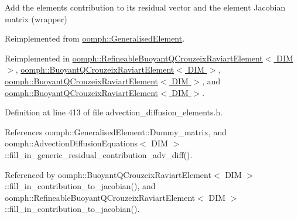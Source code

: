 Add the element\textquotesingle{}s contribution to its residual vector and the element Jacobian matrix (wrapper) 



Reimplemented from \hyperlink{classoomph_1_1GeneralisedElement_a6ae09fc0d68e4309ac1b03583d252845}{oomph\+::\+Generalised\+Element}.



Reimplemented in \hyperlink{classoomph_1_1RefineableBuoyantQCrouzeixRaviartElement_a0d05a727999c7f102f3fe2bacce38f6b}{oomph\+::\+Refineable\+Buoyant\+Q\+Crouzeix\+Raviart\+Element$<$ D\+I\+M $>$}, \hyperlink{classoomph_1_1BuoyantQCrouzeixRaviartElement_a7bd9313dd697c1219cee4a65692388b5}{oomph\+::\+Buoyant\+Q\+Crouzeix\+Raviart\+Element$<$ D\+I\+M $>$}, \hyperlink{classoomph_1_1BuoyantQCrouzeixRaviartElement_a7bd9313dd697c1219cee4a65692388b5}{oomph\+::\+Buoyant\+Q\+Crouzeix\+Raviart\+Element$<$ D\+I\+M $>$}, and \hyperlink{classoomph_1_1BuoyantQCrouzeixRaviartElement_a7bd9313dd697c1219cee4a65692388b5}{oomph\+::\+Buoyant\+Q\+Crouzeix\+Raviart\+Element$<$ D\+I\+M $>$}.



Definition at line 413 of file advection\+\_\+diffusion\+\_\+elements.\+h.



References oomph\+::\+Generalised\+Element\+::\+Dummy\+\_\+matrix, and oomph\+::\+Advection\+Diffusion\+Equations$<$ D\+I\+M $>$\+::fill\+\_\+in\+\_\+generic\+\_\+residual\+\_\+contribution\+\_\+adv\+\_\+diff().



Referenced by oomph\+::\+Buoyant\+Q\+Crouzeix\+Raviart\+Element$<$ D\+I\+M $>$\+::fill\+\_\+in\+\_\+contribution\+\_\+to\+\_\+jacobian(), and oomph\+::\+Refineable\+Buoyant\+Q\+Crouzeix\+Raviart\+Element$<$ D\+I\+M $>$\+::fill\+\_\+in\+\_\+contribution\+\_\+to\+\_\+jacobian().

\mbox{\label{classoomph_1_1AdvectionDiffusionEquations_aed50fe00556434c01bc855766edeb564}} 
